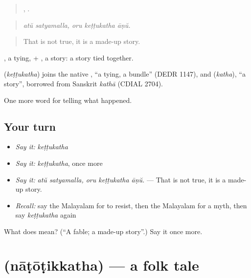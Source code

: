 \begin{quote}
 ,   .
\end{quote}

\begin{quote}
\emph{atŭ satyamalla, oru keṭṭukatha āṇŭ.}
\end{quote}

\begin{quote}
That is not true, it is a made-up story.
\end{quote}

, a tying, + , a story: a story tied together.

\begin{cousinweb}
\textbf{} (\emph{keṭṭukatha}) joins the native , \textquotedblleft{}a tying, a bundle\textquotedblright{} (DEDR 1147), and  (\emph{katha}), \textquotedblleft{}a story\textquotedblright{}, borrowed from Sanskrit \emph{kathā} (CDIAL 2704).
\end{cousinweb}

\begin{grammarlens}[title={What you've built}]
One more word for telling what happened.
\end{grammarlens}

\subsection*{Your turn}
\begin{itemize}
\raggedright
  \item \emph{Say it:} \emph{keṭṭukatha}
  \item \emph{Say it:} \emph{keṭṭukatha}, once more
  \item \emph{Say it:} \emph{atŭ satyamalla, oru keṭṭukatha āṇŭ.} — That is not true, it is a made-up story.
  \item \emph{Recall:} say the Malayalam for to resist, then the Malayalam for a myth, then say \emph{keṭṭukatha} again
\end{itemize}

\begin{tcolorbox}[breakable,colback=teal!4,colframe=teal!35!black,title={Before you move on}]
What does  mean? (\textquotedblleft{}A fable; a made-up story\textquotedblright{}.) Say it once more.
\end{tcolorbox}
\section[\texorpdfstring{\ml{നാടോടിക്കഥ} (nāṭōṭikkatha)}{നാടോടിക്കഥ (nāṭōṭikkatha)}]{ (nāṭōṭikkatha) — a folk tale}

